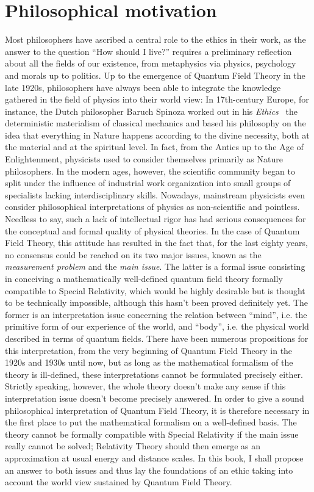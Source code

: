 \documentclass[10pt,a4paper,twoside,openany]{book}
\begin{document}
\section*{Philosophical motivation}

Most philosophers have ascribed a central role to the ethics in their work, as the answer to the question ``How should I live?'' requires a preliminary reflection about all the fields of our existence, from metaphysics via physics, psychology and morals up to politics. Up to the emergence of Quantum Field Theory in the late 1920s, philosophers have always been able to integrate the knowledge gathered in the field of physics into their world view: In 17th-century Europe, for instance, the Dutch philosopher Baruch Spinoza worked out in his \textit{Ethics}~\cite{Spinoza1677} the deterministic materialism of classical mechanics and based his philosophy on the idea that everything in Nature happens according to the divine necessity, both at the material and at the spiritual level. In fact, from the Antics up to the Age of Enlightenment, physicists used to consider themselves primarily as Nature philosophers. In the modern ages, however, the scientific community began to split under the influence of industrial work organization into small groups of specialists lacking interdisciplinary skills. Nowadays, mainstream physicists even consider philosophical interpretations of physics as non-scientific and pointless. Needless to say, such a lack of intellectual rigor has had serious consequences for the conceptual and formal quality of physical theories. In the case of Quantum Field Theory, this attitude has resulted in the fact that, for the last eighty years, no consensus could be reached on its two major issues, known as the \textit{measurement problem} and the \textit{main issue}. The latter is a formal issue consisting in conceiving a mathematically well-defined quantum field theory formally compatible to Special Relativity\footnotemark[1], which would be highly desirable but is thought to be technically impossible, although this hasn't been proved definitely yet. The former is an interpretation issue concerning the relation between ``mind'', i.e. the primitive form of our experience of the world, and ``body'', i.e. the physical world described in terms of quantum fields. There have been numerous propositions for this interpretation, from the very beginning of Quantum Field Theory in the 1920s and 1930s until now, but as long as the mathematical formalism of the theory is ill-defined, these interpretations cannot be formulated precisely either. Strictly speaking, however, the whole theory doesn't make any sense if this interpretation issue doesn't become precisely answered. In order to give a sound philosophical interpretation of Quantum Field Theory, it is therefore necessary in the first place to put the mathematical formalism on a well-defined basis. The theory cannot be formally compatible with Special Relativity if the main issue really cannot be solved; Relativity Theory should then emerge as an approximation at usual energy and distance scales. In this book, I shall propose an answer to both issues and thus lay the foundations of an ethic taking into account the world view sustained by Quantum Field Theory.
\end{document}

